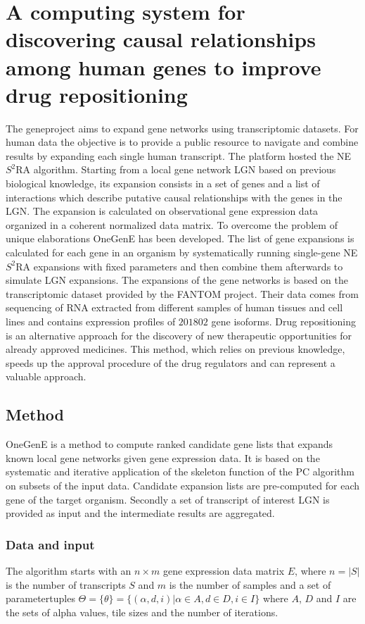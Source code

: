 			

\section{A computing system for discovering causal relationships among human genes to improve drug repositioning}
The gene\@home project aims to expand gene networks using transcriptomic datasets.
For human data the objective is to provide a public resource to navigate and combine results by expanding each single human transcript.
The platform hosted the NE$S^2$RA algorithm.
Starting from a local gene network LGN based on previous biological knowledge, its expansion consists in a set of genes and a list of interactions which describe putative causal relationships with the genes in the LGN.
The expansion is calculated on observational gene expression data organized in a coherent normalized data matrix.
To overcome the problem of unique elaborations OneGenE has been developed.
The list of gene expansions is calculated for each gene in an organism by systematically running single-gene NE$S^2$RA expansions with fixed parameters and then combine them afterwards to simulate LGN expansions.
The expansions of the gene networks is based on the transcriptomic dataset provided by the FANTOM project.
Their data comes from sequencing of RNA extracted from different samples of human tissues and cell lines and contains expression profiles of $201802$ gene isoforms.
Drug repositioning is an alternative approach for the discovery of new therapeutic opportunities for already approved medicines.
This method, which relies on previous knowledge, speeds up the approval procedure of the drug regulators and can represent a valuable approach.

	\subsection{Method}
	OneGenE is a method to compute ranked candidate gene lists that expands known local gene networks given gene expression data.
	It is based on the systematic and iterative application of the skeleton function of the PC algorithm on subsets of the input data.
	Candidate expansion lists are pre-computed for each gene of the target organism.
	Secondly a set of transcript of interest LGN is provided as input and the intermediate results are aggregated.

	
		\subsubsection{Data and input}
		The algorithm starts with an $n\times m$ gene expression data matrix $E$, where $n=|S|$ is the number of transcripts $S$ and $m$ is the number of samples and a set of parametertuples $\Theta = \{\theta\} = \{(\alpha, d, i)|\alpha\in A, d\in D, i\in I\}$ where $A$, $D$ and $I$ are the sets of alpha values, tile sizes and the number of iterations.

